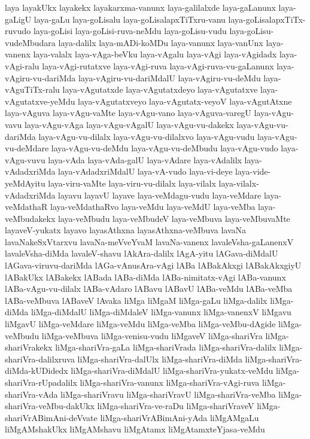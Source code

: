 {laya
layakUkx
layakekx
layakarxma-vanunx
laya-galilalxde
laya-gaLanunx
laya-gaLigU
laya-gaLu
laya-goLisalu
laya-goLisalapxTiTxru-vanu
laya-goLisalapxTiTx-ruvudo
laya-goLisi
laya-goLisi-ruva-neMdu
laya-goLisu-vudu
laya-goLisu-vudeMbudara
laya-dalilx
laya-mADi-koMDu
laya-vanunx
laya-vanUnx
laya-vanenx
laya-valalx
laya-vAga-beVku
laya-vAgalu
laya-vAgi
laya-vAgidadx
laya-vAgi-ralu
laya-vAgi-rutatxve
laya-vAgi-ruva
laya-vAgi-ruva-vu-gaLanunx
laya-vAgiru-vu-dariMda
laya-vAgiru-vu-dariMdalU
laya-vAgiru-vu-deMdu
laya-vAguTiTx-ralu
laya-vAgutatxde
laya-vAgutatxdeyo
laya-vAgutatxve
laya-vAgutatxve-yeMdu
laya-vAgutatxveyo
laya-vAgutatx-veyoV
laya-vAgutAtxne
laya-vAguva
laya-vAgu-vaMte
laya-vAgu-vano
laya-vAguva-varegU
laya-vAgu-vavu
laya-vAgu-vAga
laya-vAgu-vAgalU
laya-vAgu-vu-dakekx
laya-vAgu-vu-dariMda
laya-vAgu-vu-dilalx
laya-vAgu-vu-dilalxvo
laya-vAgu-vudu
laya-vAgu-vu-deMdare
laya-vAgu-vu-deMdu
laya-vAgu-vu-deMbudu
laya-vAgu-vudo
laya-vAgu-vuvu
laya-vAda
laya-vAda-galU
laya-vAdare
laya-vAdalilx
laya-vAdadxriMda
laya-vAdadxriMdalU
laya-vA-vudo
laya-vi-deye
laya-vide-yeMdAyitu
laya-viru-vaMte
laya-viru-vu-dilalx
laya-vilalx
laya-vilalx-vAdadxriMda
layavu
layavU
layave
laya-veMdagu-vudu
laya-veMdare
laya-veMdathaR
laya-veMdathaRvo
laya-veMdu
laya-veMdU
laya-veMba
laya-veMbudakekx
laya-veMbudu
laya-veMbudeV
laya-veMbuva
laya-veMbuvaMte
layaveV-yukatx
layavo
layasAthxna
layasAthxna-veMbuva
lavaNa
lavaNakeSxVtarxvu
lavaNa-meVveYvaM
lavaNa-vanenx
lavaleVsha-gaLanenxV
lavaleVsha-diMda
lavaleV-shavu
lAkAra-dalilx
lAgA-yitu
lAGava-diMdalU
lAGava-viruvu-dariMda
lAGa-vAnusAra-vAgi
lABa
lABakAkxgi
lABakAkxgiyU
lABakUkx
lABakekx
lABada
lABa-diMda
lABa-nimitatx-vAgi
lABa-vanunx
lABa-vAgu-vu-dilalx
lABa-vAdaro
lABavu
lABavU
lABa-veMdu
lABa-veMba
lABa-veMbuva
lABaveV
lAvaka
liMga
liMgaM
liMga-gaLu
liMga-dalilx
liMga-diMda
liMga-diMdalU
liMga-diMdaleV
liMga-vanunx
liMga-vanenxV
liMgavu
liMgavU
liMga-veMdare
liMga-veMdu
liMga-veMba
liMga-veMbu-dAgide
liMga-veMbudu
liMga-veMbuva
liMga-venisu-vudu
liMgaveV
liMga-shariVra
liMga-shariVrakekx
liMga-shariVra-gaLa
liMga-shariVrada
liMga-shariVra-dalilx
liMga-shariVra-dalilxruva
liMga-shariVra-dalUlx
liMga-shariVra-diMda
liMga-shariVra-diMda-kUDidedx
liMga-shariVra-diMdalU
liMga-shariVra-yukatx-veMdu
liMga-shariVra-rUpadalilx
liMga-shariVra-vanunx
liMga-shariVra-vAgi-ruva
liMga-shariVra-vAda
liMga-shariVravu
liMga-shariVravU
liMga-shariVra-veMba
liMga-shariVra-veMbu-dakUkx
liMga-shariVra-ve-raDu
liMga-shariVraveV
liMga-shariVrABimAni-deVvate
liMga-shariVrABimAni-yAda
liMgAMgaLu
liMgAMshakUkx
liMgAMshavu
liMgAtamx
liMgAtamxteYjasa-veMdu
}
